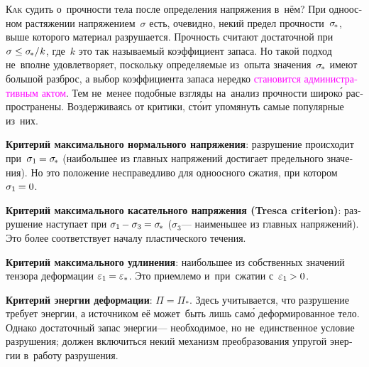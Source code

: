 \begin{otherlanguage}{russian}

\lettrine[lines=2, findent=2pt, nindent=0pt]{К}{ак} судить о~прочности тела после определения напряжения в~нём? При одноосном растяжении напряжением~$\sigma$ есть, очевидно, некий предел прочности~${\sigma_{\hspace{-0.25ex}*}}$, выше которого материал разрушается. Прочность считают достаточной при~${\sigma \leq \sigma_{\hspace{-0.25ex}*} / \hspace{.1ex} k}$, где~$k$ это так называемый коэффициент запаса. Но такой подход не~вполне удовлетворяет, поскольку определяемые из~опыта значения~${\sigma_{\hspace{-0.25ex}*}}$ имеют большой разброс, а выбор коэффициента запаса нередко \textcolor{magenta}{становится административным актом}. Тем не~менее подобные взгляды на~анализ прочности широк\'{о} распространены. Воздерживаясь от критики, ст\'{о}ит упомянуть самые популярные из~них.

\textbf{Критерий максимального нормального напряжения}: разрушение происходит при~${\sigma_1 \hspace{-0.12ex} = \sigma_{\hspace{-0.25ex}*}}$ (наибольшее из главных напряжений достигает предельного значения). Но это положение несправедливо для одноосного сжатия, при котором ${\sigma_1 \hspace{-0.12ex} = 0}$.

\textbf{Критерий максимального касательного напряжения (Tresca criterion)}: разрушение наступает при ${\sigma_1 \hspace{-0.16ex} - \sigma_3 \hspace{-0.1ex} = \sigma_{\hspace{-0.25ex}*}}$ ($\sigma_3$\:--- наименьшее из главных напряжений). Это более соответствует началу пластического течения.

\textbf{Критерий максимального удлинения}: наибольшее из собственных значений тензора деформации ${\varepsilon_1 \hspace{-0.12ex} = \varepsilon_*}$. Это приемлемо и~при~сжатии с~${\varepsilon_1 \hspace{-0.12ex} > 0}$.

\textbf{Критерий энергии деформации}: ${\Pi = \Pi_*}$. Здесь учитывается, что разрушение требует энергии, а источником её может~быть лишь сам\'{о} деформированное тело. Однако достаточный запас энергии\:--- необходимое, но не~единственное условие разрушения; должен включиться некий механизм преобразования упругой энергии в~работу разрушения.


\end{otherlanguage}
